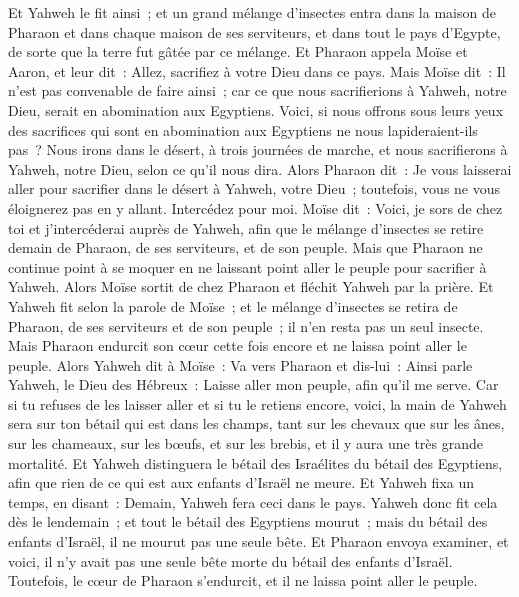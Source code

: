 \begin{multicols}{2}
Et Yahweh le fit ainsi~; et un grand mélange d'insectes entra dans la maison de Pharaon et dans chaque maison de ses serviteurs, et dans tout le pays d'Egypte, de sorte que la terre fut gâtée par ce mélange.
 Et Pharaon appela Moïse et Aaron, et leur dit~: Allez, sacrifiez à votre Dieu dans ce pays.
Mais Moïse dit~: Il n'est pas convenable de faire ainsi~; car ce que nous sacrifierions à Yahweh, notre Dieu, serait en abomination aux Egyptiens. Voici, si nous offrons sous leurs yeux des sacrifices qui sont en abomination aux Egyptiens ne nous lapideraient-ils pas~?
Nous irons dans le désert, à trois journées de marche, et nous sacrifierons à Yahweh, notre Dieu, selon ce qu'il nous dira.
Alors Pharaon dit~: Je vous laisserai aller pour sacrifier dans le désert à Yahweh, votre Dieu~; toutefois, vous ne vous éloignerez pas en y allant. Intercédez pour moi.
Moïse dit~: Voici, je sors de chez toi et j'intercéderai auprès de Yahweh, afin que le mélange d'insectes se retire demain de Pharaon, de ses serviteurs, et de son peuple. Mais que Pharaon ne continue point à se moquer en ne laissant point aller le peuple pour sacrifier à Yahweh.
Alors Moïse sortit de chez Pharaon et fléchit Yahweh par la prière.
Et Yahweh fit selon la parole de Moïse~; et le mélange d'insectes se retira de Pharaon, de ses serviteurs et de son peuple~; il n'en resta pas un seul insecte.
Mais Pharaon endurcit son cœur cette fois encore et ne laissa point aller le peuple.
\VerseOne{}Alors Yahweh dit à Moïse~: Va vers Pharaon et dis-lui~: Ainsi parle Yahweh, le Dieu des Hébreux~: Laisse aller mon peuple, afin qu'il me serve.
Car si tu refuses de les laisser aller et si tu le retiens encore,
voici, la main de Yahweh sera sur ton bétail qui est dans les champs, tant sur les chevaux que sur les ânes, sur les chameaux, sur les bœufs, et sur les brebis, et il y aura une très grande mortalité.
Et Yahweh distinguera le bétail des Israélites du bétail des Egyptiens, afin que rien de ce qui est aux enfants d'Israël ne meure.
Et Yahweh fixa un temps, en disant~: Demain, Yahweh fera ceci dans le pays.
Yahweh donc fit cela dès le lendemain~; et tout le bétail des Egyptiens mourut~; mais du bétail des enfants d'Israël, il ne mourut pas une seule bête.
Et Pharaon envoya examiner, et voici, il n'y avait pas une seule bête morte du bétail des enfants d'Israël. Toutefois, le cœur de Pharaon s'endurcit, et il ne laissa point aller le peuple.

\end{multicols}
